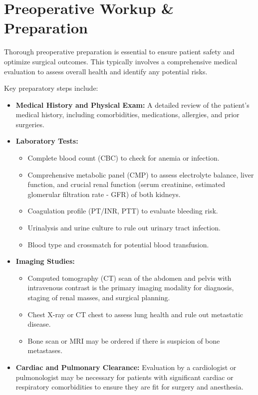 \section*{Preoperative Workup \& Preparation}
Thorough preoperative preparation is essential to ensure patient safety and optimize surgical outcomes. This typically involves a comprehensive medical evaluation to assess overall health and identify any potential risks.

Key preparatory steps include:
\begin{itemize}
  \item \textbf{Medical History and Physical Exam:} A detailed review of the patient's medical history, including comorbidities, medications, allergies, and prior surgeries.
  \item \textbf{Laboratory Tests:}
    \begin{itemize}
      \item Complete blood count (CBC) to check for anemia or infection.
      \item Comprehensive metabolic panel (CMP) to assess electrolyte balance, liver function, and crucial renal function (serum creatinine, estimated glomerular filtration rate - GFR) of both kidneys.
      \item Coagulation profile (PT/INR, PTT) to evaluate bleeding risk.
      \item Urinalysis and urine culture to rule out urinary tract infection.
      \item Blood type and crossmatch for potential blood transfusion.
    \end{itemize}
  \item \textbf{Imaging Studies:}
    \begin{itemize}
      \item Computed tomography (CT) scan of the abdomen and pelvis with intravenous contrast is the primary imaging modality for diagnosis, staging of renal masses, and surgical planning.
      \item Chest X-ray or CT chest to assess lung health and rule out metastatic disease.
      \item Bone scan or MRI may be ordered if there is suspicion of bone metastases.
    \end{itemize}
  \item \textbf{Cardiac and Pulmonary Clearance:} Evaluation by a cardiologist or pulmonologist may be necessary for patients with significant cardiac or respiratory comorbidities to ensure they are fit for surgery and anesthesia.

\end{itemize}
